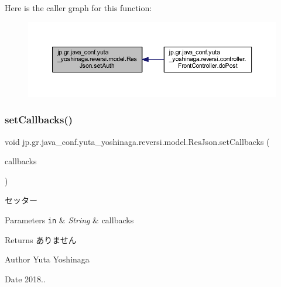 Here is the caller graph for this function\+:
\nopagebreak
\begin{figure}[H]
\begin{center}
\leavevmode
\includegraphics[width=350pt]{classjp_1_1gr_1_1java__conf_1_1yuta__yoshinaga_1_1reversi_1_1model_1_1_res_json_aec94a5246bf7245af19f8f72100e986c_icgraph}
\end{center}
\end{figure}
\mbox{\label{classjp_1_1gr_1_1java__conf_1_1yuta__yoshinaga_1_1reversi_1_1model_1_1_res_json_a2c93a1f6a03a04909da59238c7e68ca3}} 
\subsubsection{\texorpdfstring{set\+Callbacks()}{setCallbacks()}}
{\footnotesize\ttfamily void jp.\+gr.\+java\+\_\+conf.\+yuta\+\_\+yoshinaga.\+reversi.\+model.\+Res\+Json.\+set\+Callbacks (\begin{DoxyParamCaption}\item[{\mbox{\hyperlink{classjp_1_1gr_1_1java__conf_1_1yuta__yoshinaga_1_1reversi_1_1model_1_1_callbacks_json}{Callbacks\+Json}}}]{callbacks }\end{DoxyParamCaption})}



セッター 


\begin{DoxyParams}[1]{Parameters}
\mbox{\tt in}  & {\em String} & callbacks \\
\hline
\end{DoxyParams}
\begin{DoxyReturn}{Returns}
ありません 
\end{DoxyReturn}
\begin{DoxyAuthor}{Author}
Yuta Yoshinaga 
\end{DoxyAuthor}
\begin{DoxyDate}{Date}
2018.. 
\end{DoxyDate}


